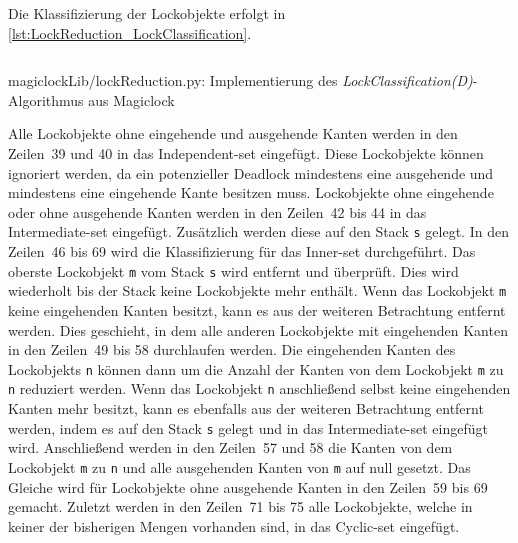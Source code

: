 Die Klassifizierung der Lockobjekte erfolgt in
\cref{lst:LockReduction_LockClassification}.
\begin{listing}[ht]
  \inputminted[frame=lines,linenos,firstline=35,lastline=77]{python}{./Python/magiclockLib/lockReduction.py}
  \caption{magiclockLib/lockReduction.py: Implementierung des \emph{LockClassification(D)}-Algorithmus aus Magiclock \autocite[5]{MagicLock}}
  \label{lst:LockReduction_LockClassification}
\end{listing}
Alle Lockobjekte ohne eingehende und ausgehende Kanten werden in den Zeilen~39
und 40 in das \textrm{Independent-set} eingefügt. Diese Lockobjekte können
ignoriert werden, da ein potenzieller Deadlock mindestens eine ausgehende und
mindestens eine eingehende Kante besitzen muss. Lockobjekte ohne eingehende oder
ohne ausgehende Kanten werden in den Zeilen~42 bis 44 in das
\textrm{Intermediate-set} eingefügt. Zusätzlich werden diese auf den Stack
\texttt{s} gelegt. In den Zeilen~46 bis 69 wird die Klassifizierung für das
\textrm{Inner-set} durchgeführt. Das oberste Lockobjekt \texttt{m} vom Stack \texttt{s}
wird entfernt und überprüft. Dies wird wiederholt bis der Stack keine
Lockobjekte mehr enthält. Wenn das Lockobjekt \texttt{m} keine eingehenden
Kanten besitzt, kann es aus der weiteren Betrachtung entfernt werden. Dies
geschieht, in dem alle anderen Lockobjekte mit eingehenden Kanten in den
Zeilen~49 bis 58 durchlaufen werden. Die eingehenden Kanten des Lockobjekts
\texttt{n} können dann um die Anzahl der Kanten von dem Lockobjekt \texttt{m} zu
\texttt{n} reduziert werden. Wenn das Lockobjekt \texttt{n} anschließend selbst
keine eingehenden Kanten mehr besitzt, kann es ebenfalls aus der weiteren
Betrachtung entfernt werden, indem es auf den Stack \texttt{s} gelegt und in das
\textrm{Intermediate-set} eingefügt wird. Anschließend werden in den Zeilen~57
und 58 die Kanten von dem Lockobjekt \texttt{m} zu \texttt{n} und alle
ausgehenden Kanten von \texttt{m} auf null gesetzt. Das Gleiche wird für
Lockobjekte ohne ausgehende Kanten in den Zeilen~59 bis 69 gemacht. Zuletzt
werden in den Zeilen~71 bis 75 alle Lockobjekte, welche in keiner der bisherigen
Mengen vorhanden sind, in das \textrm{Cyclic-set} eingefügt.

